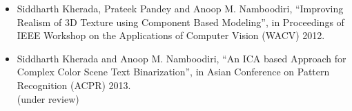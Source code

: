 \begin{itemize}
 \item Siddharth Kherada, Prateek Pandey and Anoop M. Namboodiri, ``Improving Realism of 3D Texture 
using Component Based Modeling'', in Proceedings of IEEE Workshop on the Applications of Computer Vision (WACV) 2012.
\item Siddharth Kherada and Anoop M. Namboodiri, ``An ICA based Approach for Complex Color Scene
Text Binarization'', in Asian Conference on Pattern Recognition (ACPR) 2013.\\
(under review)
\end{itemize}



